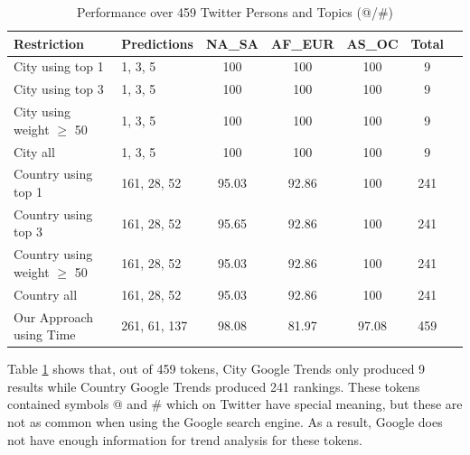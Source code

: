 \begin{table}[htbp]
\small
\caption{Performance over 459 Twitter Persons and Topics (@/\#)}
\label{table_5new_2}
\centering
\begin{tabular}{|l|l|c|c|c|c|c|}
\hline
\bfseries Restriction & \bfseries Predictions & \bfseries NA\_SA & \bfseries AF\_EUR & \bfseries AS\_OC & \bfseries Total\\
\hline
City using top 1& 1, 3, 5&100&100&100&9\\
\hline
City using top 3& 1, 3, 5&100&100&100&9\\
\hline
City using weight $\geq$ 50& 1, 3, 5&100&100&100&9\\
\hline
City all	& 1, 3, 5&100&100&100&9\\
\hline
Country using top 1&161, 28, 52&95.03&92.86&100&241\\
\hline
Country using top 3&161, 28, 52&95.65&92.86&100&241\\
\hline
Country using weight $\geq$ 50&161, 28, 52&95.03&92.86&100&241\\
\hline
Country all&161, 28, 52&95.03&92.86&100&241\\
\hline
Our Approach using Time & 261, 61, 137 & 98.08 & 81.97 & 97.08&459\\
\hline
\end{tabular}
\end{table}

Table \ref{table_5new_2} shows that, out of 459 tokens, City Google Trends only produced 9 results while Country Google Trends produced 241 rankings. These tokens contained symbols @ and \# which on Twitter have special meaning, but these are not as common when using the Google search engine. As a result, Google does not have enough information for trend analysis for these tokens. 

